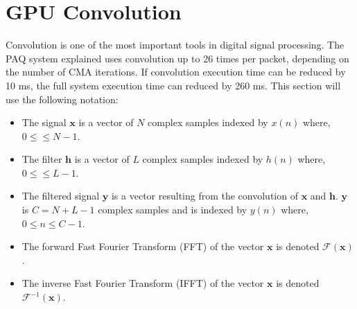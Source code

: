 \section{GPU Convolution}
\label{chap:gpu_convolution}
Convolution is one of the most important tools in digital signal processing.
The PAQ system explained uses convolution up to 26 times per packet, depending on the number of CMA iterations.
If convolution execution time can be reduced by 10 ms, the full system execution time can reduced by 260 ms.
This section will use the following notation: 
\begin{itemize}
\item The signal $\mathbf{x}$ is a vector of $N$ complex samples indexed by $x(n)$ where, $0 \leq \leq N-1$.
\item The filter $\mathbf{h}$ is a vector of $L$ complex samples indexed by $h(n)$ where, $0 \leq \leq L-1$.
\item The filtered signal $\mathbf{y}$ is a vector resulting from the convolution of $\mathbf{x}$ and $\mathbf{h}$. $\mathbf{y}$ is $C = N + L -1$ complex samples and is indexed by $y(n)$ where, $0 \leq n \leq C-1$.
\item The forward Fast Fourier Transform (FFT) of the vector $\mathbf{x}$ is denoted $\mathscr{F}(\mathbf{x})$.
\item The inverse Fast Fourier Transform (IFFT) of the vector $\mathbf{x}$ is denoted $\mathscr{F}^{-1}(\mathbf{x})$.
\end{itemize}


